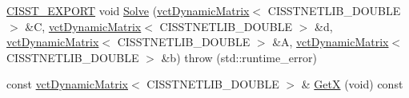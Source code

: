 \begin{DoxyCompactItemize}
\item 
\hyperlink{cmn_export_macros_8h_a99393e0c3ac434b2605235bbe20684f8}{C\+I\+S\+S\+T\+\_\+\+E\+X\+P\+O\+R\+T} void \hyperlink{classnmr_l_s_i_solver_a20d8a45ef8a1c85ba6f8ea225f8d90dd}{Solve} (\hyperlink{classvct_dynamic_matrix}{vct\+Dynamic\+Matrix}$<$ C\+I\+S\+S\+T\+N\+E\+T\+L\+I\+B\+\_\+\+D\+O\+U\+B\+L\+E $>$ \&C, \hyperlink{classvct_dynamic_matrix}{vct\+Dynamic\+Matrix}$<$ C\+I\+S\+S\+T\+N\+E\+T\+L\+I\+B\+\_\+\+D\+O\+U\+B\+L\+E $>$ \&d, \hyperlink{classvct_dynamic_matrix}{vct\+Dynamic\+Matrix}$<$ C\+I\+S\+S\+T\+N\+E\+T\+L\+I\+B\+\_\+\+D\+O\+U\+B\+L\+E $>$ \&A, \hyperlink{classvct_dynamic_matrix}{vct\+Dynamic\+Matrix}$<$ C\+I\+S\+S\+T\+N\+E\+T\+L\+I\+B\+\_\+\+D\+O\+U\+B\+L\+E $>$ \&b)  throw (std\+::runtime\+\_\+error)
\item 
const \hyperlink{classvct_dynamic_matrix}{vct\+Dynamic\+Matrix}$<$ C\+I\+S\+S\+T\+N\+E\+T\+L\+I\+B\+\_\+\+D\+O\+U\+B\+L\+E $>$ \& \hyperlink{classnmr_l_s_i_solver_a926eb92277cb37a283861ee062de4343}{Get\+X} (void) const 
\end{DoxyCompactItemize}
